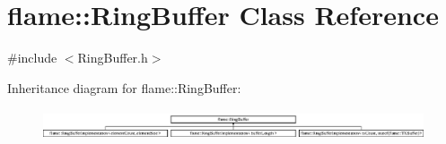\hypertarget{classflame_1_1_ring_buffer}{\section{flame\-:\-:Ring\-Buffer Class Reference}
\label{classflame_1_1_ring_buffer}
}


{\ttfamily \#include $<$Ring\-Buffer.\-h$>$}

Inheritance diagram for flame\-:\-:Ring\-Buffer\-:\begin{figure}[H]
\begin{center}
\leavevmode
\includegraphics[height=0.942761cm]{classflame_1_1_ring_buffer}
\end{center}
\end{figure}
